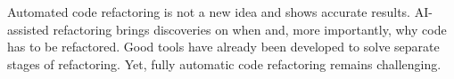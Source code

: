 Automated code refactoring is not a new idea and shows accurate results. AI-assisted refactoring brings discoveries on when and, more importantly, why code has to be refactored.
Good tools have already been developed to solve separate stages of refactoring. Yet, fully automatic code refactoring remains challenging.